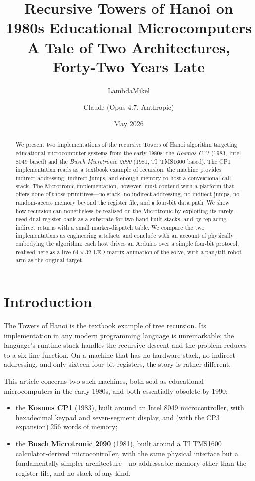 \documentclass[11pt,a4paper]{article}
\title{Recursive Towers of Hanoi on 1980s Educational Microcomputers \\
  \large A Tale of Two Architectures, Forty-Two Years Late}
\author{LambdaMikel \and Claude (Opus 4.7, Anthropic)}
\date{May 2026}
\begin{document}
\maketitle

\begin{abstract}
We present two implementations of the recursive Towers of Hanoi
algorithm targeting educational microcomputer systems from the early
1980s: the \emph{Kosmos CP1} (1983, Intel 8049 based) and the
\emph{Busch Microtronic 2090} (1981, TI~TMS1600 based). The CP1
implementation reads as a textbook example of recursion: the machine
provides indirect addressing, indirect jumps, and enough memory to
host a conventional call stack. The Microtronic implementation,
however, must contend with a platform that offers none of those
primitives---no stack, no indirect addressing, no indirect jumps, no
random-access memory beyond the register file, and a four-bit data
path. We show how recursion can nonetheless be realised on the
Microtronic by exploiting its rarely-used dual register bank as a
substrate for two hand-built stacks, and by replacing indirect
returns with a small marker-dispatch table. We compare the two
implementations as engineering artefacts and conclude with an
account of physically embodying the algorithm: each host drives an
Arduino over a simple four-bit protocol, realised here as a live
$64\times32$ LED-matrix animation of the solve, with a pan/tilt robot
arm as the original target.
\end{abstract}

\section{Introduction}

The Towers of Hanoi is the textbook example of tree recursion. Its
implementation in any modern programming language is unremarkable;
the language's runtime stack handles the recursive descent and the
problem reduces to a six-line function. On a machine that has no
hardware stack, no indirect addressing, and only sixteen four-bit
registers, the story is rather different.

This article concerns two such machines, both sold as educational
microcomputers in the early 1980s, and both essentially obsolete by
1990:

\begin{itemize}
  \item the \textbf{Kosmos CP1} (1983), built around an Intel 8049
    microcontroller, with hexadecimal keypad and seven-segment display,
    and (with the CP3 expansion) 256 words of memory;
  \item the \textbf{Busch Microtronic 2090} (1981), built around a TI
    TMS1600 calculator-derived microcontroller, with the same physical
    interface but a fundamentally simpler architecture---no addressable
    memory other than the register file, and no stack of any kind.
\end{itemize}
\end{document}
